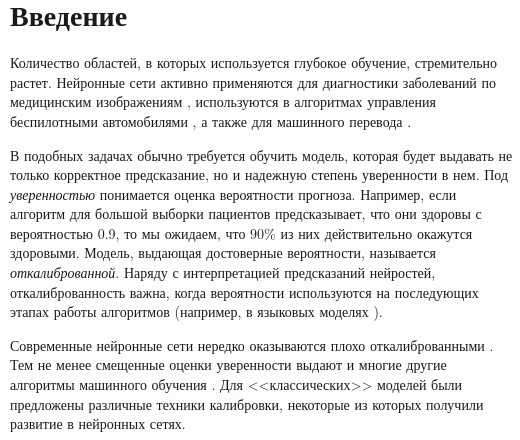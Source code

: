 \documentclass[12pt]{article}
\begin{document}
\newpage
\tableofcontents

\newpage

\section{Введение}

Количество областей, в которых используется глубокое обучение, стремительно растет. Нейронные сети активно применяются для диагностики заболеваний по медицинским изображениям \cite{medical_nn}, используются в алгоритмах управления беспилотными автомобилями \cite{self_driving}, а также для машинного перевода \cite{nmt_google}. 

В подобных задачах обычно требуется обучить модель, которая будет выдавать не только корректное предсказание, но и надежную степень уверенности в нем. Под \emph{уверенностью} понимается оценка вероятности прогноза. Например, если алгоритм для большой выборки пациентов предсказывает, что они здоровы с вероятностью 0.9, то мы ожидаем, что $90\%$ из них действительно окажутся здоровыми. Модель, выдающая достоверные вероятности, называется \emph{откалиброванной}. Наряду с интерпретацией предсказаний нейростей, откалиброванность важна, когда вероятности используются на последующих этапах работы алгоритмов (например, в языковых моделях \cite{nn_lm}).

Современные нейронные сети нередко оказываются плохо откалиброванными \cite{on_cal}. Тем не менее смещенные оценки уверенности выдают и многие другие алгоритмы машинного обучения \cite{good_proba, emp_comparison}. Для <<классических>> моделей были предложены различные техники калибровки, некоторые из которых получили развитие в нейронных сетях.
\end{document}
